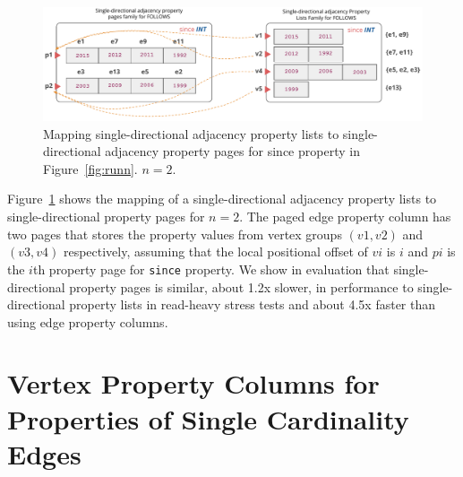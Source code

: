 
\begin{figure}
	\hfill\includegraphics[scale=0.78]{img/paged}\hspace*{\fill}
	\captionsetup{justification=centering}
	\caption{Mapping single-directional adjacency property lists to single-directional adjacency property pages for since property in Figure~\ref{fig:runn}. $n=2$.}
	\label{fig:paged}
\end{figure}

Figure~\ref{fig:paged} shows the mapping of a single-directional adjacency property lists to single-directional  property pages for $n=2$. The paged edge property column has two pages that stores the property values from vertex groups $(v1,v2)$ and $(v3,v4)$ respectively, assuming that the local positional offset of $vi$ is $i$ and $pi$ is the $i$th property page for \texttt{since} property. 
We show in evaluation that single-directional  property pages is similar, about 1.2x slower, in performance to single-directional property lists in read-heavy stress tests and about 4.5x faster than using edge property columns. 

\section{Vertex Property Columns for Properties of Single Cardinality Edges}
\label{sec:single-cardinality-cols}

